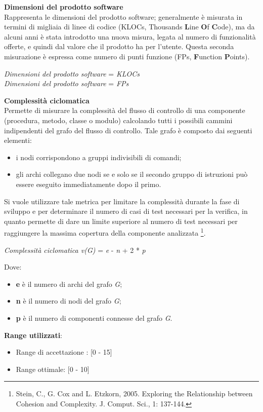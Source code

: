 \textbf{Dimensioni del prodotto software}\\

Rappresenta le dimensioni del prodotto software; generalmente \`e misurata in termini di migliaia di linee di codice (KLOCs, Thousands \textbf{L}ine \textbf{O}f \textbf{C}ode), ma da alcuni anni è stata introdotto una nuova misura, legata al numero di funzionalità offerte, e quindi dal valore che il prodotto ha per l'utente. Questa seconda misurazione è espressa come numero di punti funzione (FPs, \textbf{F}unction \textbf{P}oints). \\
\begin{center}
	\textit{Dimensioni del prodotto software} = \textit{KLOCs} \\
	\textit{Dimensioni del prodotto software} = \textit{FPs} 
\end{center}

\textbf{Complessità ciclomatica}\\

Permette di misurare la complessità del flusso di controllo di una componente (procedura, metodo, classe o modulo) calcolando tutti i possibili cammini indipendenti del grafo del flusso di controllo. Tale grafo è composto dai seguenti elementi:
\begin{itemize}
	\item i nodi corrispondono a gruppi indivisibili di comandi;
	\item gli archi collegano due nodi se e solo se il secondo gruppo di istruzioni può essere eseguito immediatamente dopo il primo.
\end{itemize}
Si vuole utilizzare tale metrica per limitare la complessità durante la fase di sviluppo e per determinare il numero di casi di test necessari per la verifica, in quanto permette di dare un limite superiore al numero di test necessari per raggiungere la massima copertura della componente analizzata \footnote{Stein, C., G. Cox and L. Etzkorn, 2005. Exploring the Relationship between Cohesion and Complexity. J. Comput. Sci., 1: 137-144.}.
\begin{center}
	\textit{Complessità ciclomatica v(G)} = \textit{e} - \textit{n} + 2 * \textit{p}
\end{center}
Dove:
\begin{itemize}
	\item \textbf{e} è il numero di archi del grafo \textit{G};
	\item \textbf{n} è il numero di nodi del grafo \textit{G};
	\item \textbf{p} è il numero di componenti connesse del grafo \textit{G}.
\end{itemize}
\textbf{Range utilizzati}:
\begin{itemize}
	\item Range di accettazione : [0 - 15]
	\item Range ottimale: [0 - 10]
\end{itemize}

